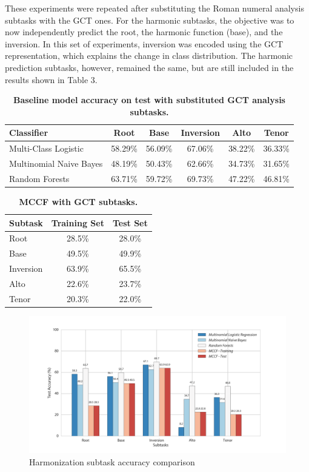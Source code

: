 \documentclass[11pt]{article}
\begin{document}
These experiments were repeated after substituting the Roman numeral analysis subtasks with the GCT ones. For the harmonic subtasks, the objective was to now independently predict the root, the harmonic function (base), and the inversion. In this set of experiments, inversion was encoded using the GCT representation, which explains the change in class distribution. The harmonic prediction subtasks, however, remained the same, but are still included in the results shown in Table 3. 

\begin{table}[h]
\begin{center}
\caption[Table caption text]{\textbf{Baseline model accuracy on test with substituted GCT analysis subtasks.}}
\begin{tabular}{l c c c c c}
Classifier & Root & Base & Inversion & Alto & Tenor \\ \hline
Multi-Class Logistic & 58.29\% & 56.09\% & 67.06\% & 38.22\% & 36.33\% \\
Multinomial Naive Bayes & 48.19\% & 50.43\% & 62.66\% & 34.73\% & 31.65\% \\
Random Forests & 63.71\% & 59.72\% & 69.73\% & 47.22\% & 46.81\% \\
\end{tabular}
\end{center}
\end{table}

\begin{table}[h]
\begin{center}
\caption[Table caption text]{\textbf{MCCF with GCT subtasks.}}
\begin{tabular}{l | c c}
Subtask & Training Set & Test Set \\ \hline
Root & 28.5\% & 28.0\% \\
Base & 49.5\% & 49.9\% \\
Inversion & 63.9\% & 65.5\% \\
Alto & 22.6\% & 23.7\% \\
Tenor & 20.3\% & 22.0\%
\end{tabular}
\end{center}
\end{table}

\begin{figure}[ht]
\caption{ Harmonization subtask accuracy comparison }
\centerline{\includegraphics[scale=0.5]{subtasks}}
\end{figure}
\end{document}
